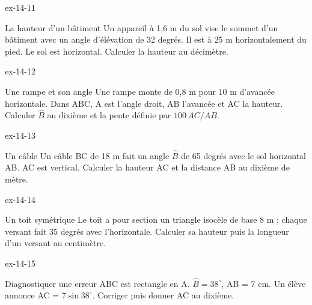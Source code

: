 \clearpage{}
\begin{blocLivre}{ex-14-11}\begin{exercice}[3]{La hauteur d’un bâtiment}
Un appareil à 1,6 m du sol vise le sommet d’un bâtiment avec un angle d’élévation de 32 degrés. Il est à 25 m horizontalement du pied. Le sol est horizontal. Calculer la hauteur au décimètre.
\label{fig-ex-14-11}
\end{exercice}\end{blocLivre}
\begin{blocLivre}{ex-14-12}\begin{exercice}[3]{Une rampe et son angle}
Une rampe monte de 0,8 m pour 10 m d’avancée horizontale. Dans ABC, A est l’angle droit, AB l’avancée et AC la hauteur. Calculer $\widehat B$ au dixième et la pente définie par $100\,AC/AB$.
\label{fig-ex-14-12}
\end{exercice}\end{blocLivre}
\begin{blocLivre}{ex-14-13}\begin{exercice}[3]{Un câble}
Un câble BC de 18 m fait un angle $\widehat B$ de 65 degrés avec le sol horizontal AB. AC est vertical. Calculer la hauteur AC et la distance AB au dixième de mètre.
\label{fig-ex-14-13}
\end{exercice}\end{blocLivre}
\begin{blocLivre}{ex-14-14}\begin{exercice}[3]{Un toit symétrique}
Le toit a pour section un triangle isocèle de base 8 m ; chaque versant fait 35 degrés avec l’horizontale. Calculer sa hauteur puis la longueur d’un versant au centimètre.
\label{fig-ex-14-14}
\end{exercice}\end{blocLivre}
\begin{blocLivre}{ex-14-15}\begin{exercice}[3]{Diagnostiquer une erreur}
ABC est rectangle en A. $\widehat B=38^\circ$, AB = 7 cm. Un élève annonce AC = $7\sin38^\circ$. Corriger puis donner AC au dixième.
\label{fig-ex-14-15}
\end{exercice}\end{blocLivre}

\clearpage
